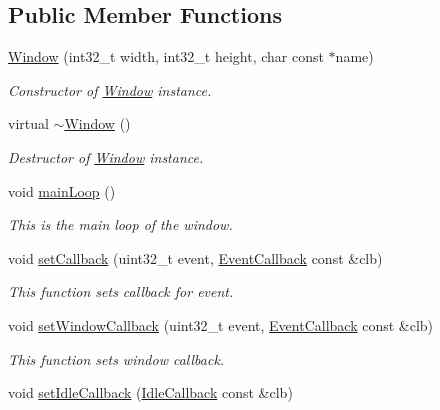 \subsection*{Public Member Functions}
\begin{DoxyCompactItemize}
\item 
\hyperlink{classWindow_ac84f7bfb1b67b73c69a582fe72339192}{Window} (int32\+\_\+t width, int32\+\_\+t height, char const $\ast$name)
\begin{DoxyCompactList}\small\item\em Constructor of \hyperlink{classWindow}{Window} instance. \end{DoxyCompactList}\item 
\mbox{\label{classWindow_a245d821e6016fa1f6970ccbbedd635f6}} 
virtual \hyperlink{classWindow_a245d821e6016fa1f6970ccbbedd635f6}{$\sim$\+Window} ()
\begin{DoxyCompactList}\small\item\em Destructor of \hyperlink{classWindow}{Window} instance. \end{DoxyCompactList}\item 
\mbox{\label{classWindow_a4e50cfd8622784e15409db62d5e11097}} 
void \hyperlink{classWindow_a4e50cfd8622784e15409db62d5e11097}{main\+Loop} ()
\begin{DoxyCompactList}\small\item\em This is the main loop of the window. \end{DoxyCompactList}\item 
void \hyperlink{classWindow_a10bc693cad6ea33409071ed50c3e880c}{set\+Callback} (uint32\+\_\+t event, \hyperlink{classWindow_a0e7a1332f3c35705eeed4d7b1a568d61}{Event\+Callback} const \&clb)
\begin{DoxyCompactList}\small\item\em This function sets callback for event. \end{DoxyCompactList}\item 
void \hyperlink{classWindow_a4cc4f07c386516c8607bfc7559319112}{set\+Window\+Callback} (uint32\+\_\+t event, \hyperlink{classWindow_a0e7a1332f3c35705eeed4d7b1a568d61}{Event\+Callback} const \&clb)
\begin{DoxyCompactList}\small\item\em This function sets window callback. \end{DoxyCompactList}\item 
void \hyperlink{classWindow_ac1cd27329e92882a1527eece8aa4bef4}{set\+Idle\+Callback} (\hyperlink{classWindow_ae666e38583ffdec789fdfc85d6504d73}{Idle\+Callback} const \&clb)

\end{DoxyCompactItemize}
